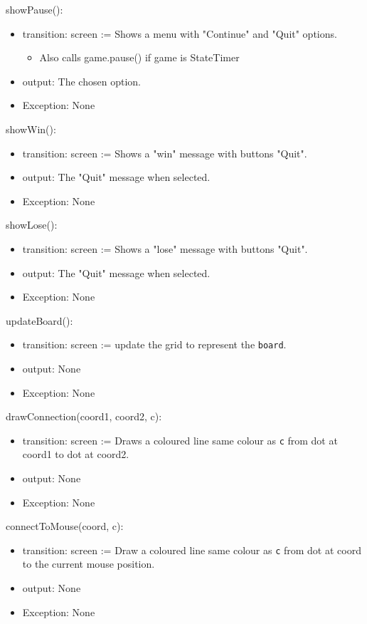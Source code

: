 \documentclass[11pt]{article}
\begin{document}
\begin{itemize}
showPause():
\begin{itemize}
\item transition: screen := Shows a menu with "Continue" and "Quit" options.
\begin{itemize}
\item Also calls game.pause() if game is StateTimer
\end{itemize}
\item output: The chosen option.
\item Exception: None
\end{itemize}

showWin():
\begin{itemize}
\item transition: screen := Shows a "win" message with buttons "Quit".
\item output: The "Quit" message when selected.
\item Exception: None
\end{itemize}

showLose():
\begin{itemize}
\item transition: screen := Shows a "lose" message with buttons "Quit".
\item output: The "Quit" message when selected.
\item Exception: None
\end{itemize}

updateBoard():
\begin{itemize}
\item transition: screen := update the grid to represent the \texttt{board}.
\item output: None
\item Exception: None
\end{itemize}

drawConnection(coord1, coord2, c):
\begin{itemize}
\item transition: screen := Draws a coloured line same colour as \texttt{c} from dot at coord1 to dot at coord2.
\item output: None
\item Exception: None
\end{itemize}

connectToMouse(coord, c):
\begin{itemize}
\item transition: screen := Draw a coloured line same colour as \texttt{c} from dot at coord to the current mouse position.
\item output: None
\item Exception: None
\end{itemize}


\end{itemize}
\end{document}
